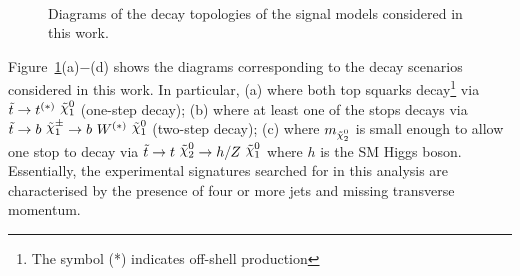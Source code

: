 			\begin{figure}[!htb]
				\centering
					\hspace{0.05\textwidth}
					\hspace{0.05\textwidth}
					\hspace{0.05\textwidth}\\
				\caption{Diagrams of the decay topologies of the signal models considered in this work.}
				\label{fig:stopModels}
			\end{figure}

			Figure~\ref{fig:stopModels}(a)$-$(d) shows the diagrams corresponding to the decay scenarios considered in this work. In particular, (a) where both top squarks decay\footnote{The symbol (*) indicates off-shell production} via $\stop\rightarrow t^{(*)}\ \ninoone$ (one-step decay); (b) where at least one of the stops decays via $\stop\rightarrow b\ \chinoonepm \rightarrow b\ \Wboson^{(*)}\ \ninoone$ (two-step decay); (c) where $m_{\ninotwo}$ is small enough to allow one stop to decay via $\stop\to t\ \ninotwo \to h/Z\ \ninoone$ where $h$ is the \ac{SM} Higgs boson. Essentially, the experimental signatures searched for in this analysis are characterised by the presence of four or more jets and missing transverse momentum. 


